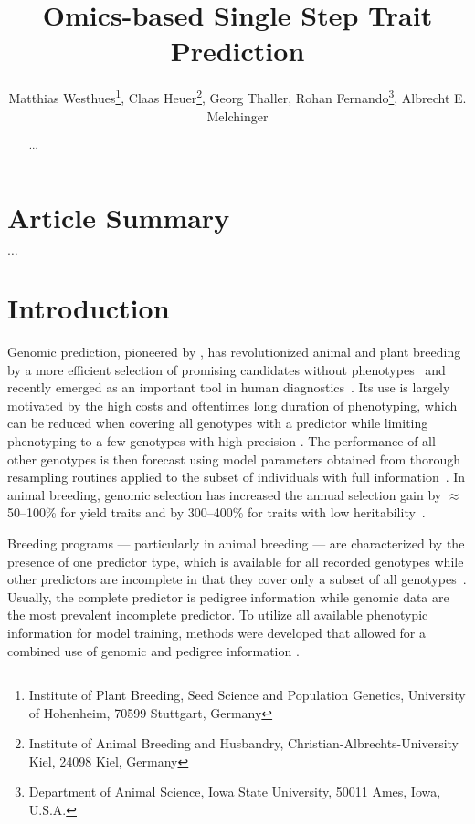 \documentclass[12pt,titlepage]{article}
\title{Omics-based Single Step Trait Prediction}
\author{
  Matthias Westhues\thanks{Institute of Plant Breeding, Seed Science and Population Genetics, University of Hohenheim, 70599 Stuttgart, Germany},
  Claas Heuer\thanks{Institute of Animal Breeding and Husbandry, Christian-Albrechts-University Kiel, 24098 Kiel, Germany},
  Georg Thaller\samethanks[2],
  Rohan Fernando\thanks{Department of Animal Science, Iowa State University, 50011 Ames, Iowa, U.S.A.},
  Albrecht E. Melchinger\samethanks[1]
}
\begin{document}
\maketitle
\doublespacing
\linenumbers



\begin{abstract}

  $\dots$

\end{abstract}



\section{Article Summary}
$\dots$



\section{Introduction}
Genomic prediction, pioneered by , has revolutionized
animal and plant breeding by a more efficient selection of promising candidates 
without phenotypes~\cite{DeLosCampos2013,Garcia-Ruiz2016} and recently emerged
as an important tool in human diagnostics~\cite{DeLosCampos2010,Vazquez2016}.
Its use is largely motivated by the high costs and oftentimes long duration of 
phenotyping, which can be reduced when covering all genotypes with a predictor 
while limiting phenotyping to a few genotypes with high precision
\cite{Kadam2016}.
The performance of all other genotypes is then forecast using model parameters
obtained from thorough resampling routines applied to the subset of individuals 
with full information~\cite{Hastie2009}.
In animal breeding, genomic selection has increased the annual selection gain 
by $\approx$ 50--100\% for yield traits and by 300--400\% for traits with low 
heritability~\cite{Garcia-Ruiz2016}.

Breeding programs --- particularly in animal breeding --- are characterized by
the presence of one predictor type, which is available for all recorded
genotypes while other predictors are incomplete in that they cover only a 
subset of all genotypes~\cite{Fragomeni2015}.
Usually, the complete predictor is pedigree information while genomic data are
the most prevalent incomplete predictor.
To utilize all available phenotypic information for model training, methods were 
developed that allowed for a combined use of genomic and pedigree information 
\cite{Hayes2009a,VanRaden2009}.
\end{document}
